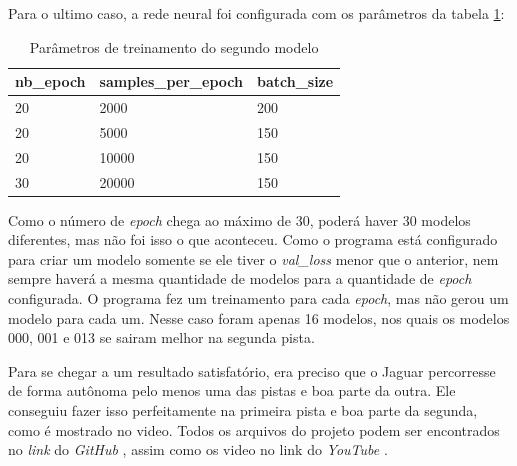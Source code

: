 	\begin{figure}[H]
		\centering
\end{figure}

Para o ultimo caso, a rede neural foi configurada com os parâmetros da tabela \ref{tabela2}:

\begin{table}[H]
\centering
\caption{Parâmetros de treinamento do segundo modelo}
\label{tabela2}
\begin{tabular}{|l|l|l|}
\hline
nb\_epoch & samples\_per\_epoch & batch\_size \\ \hline
20        & 2000                & 200         \\
20        & 5000                & 150         \\
20        & 10000               & 150         \\
30        & 20000               & 150         \\ \hline
\end{tabular}
\end{table}

Como o número de \textit{epoch} chega ao máximo de 30, poderá haver 30 modelos diferentes, mas não foi isso o que aconteceu. Como o programa está configurado para criar um modelo somente se ele tiver o \textit{val\_loss} menor que o anterior, nem sempre haverá a mesma quantidade de modelos para a quantidade de \textit{epoch} configurada. O programa fez um treinamento para cada \textit{epoch}, mas não gerou um modelo para cada um. Nesse caso foram apenas 16 modelos, nos quais os modelos 000, 001 e 013 se sairam melhor na segunda pista.

Para se chegar a um resultado satisfatório, era preciso que o Jaguar percorresse de forma autônoma pelo menos uma das pistas e boa parte da outra. Ele conseguiu fazer isso perfeitamente na primeira pista e boa parte da segunda, como é mostrado no video. Todos os arquivos do projeto podem ser encontrados no \textit{link} do \textit{GitHub} \cite{github}, assim como os video no link do \textit{YouTube} \cite{Youtube}.